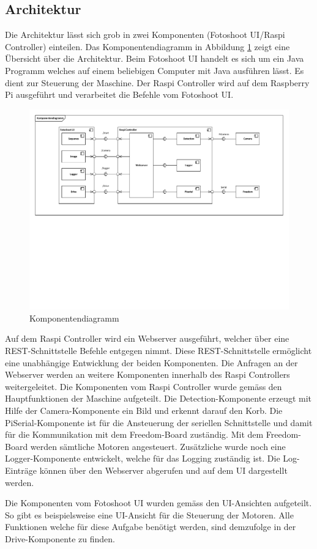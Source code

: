 \subsection{Architektur}

Die Architektur lässt sich grob in zwei Komponenten (Fotoshoot UI/Raspi Controller) einteilen. Das Komponentendiagramm in Abbildung \ref{fig:komponentendiagramm} zeigt eine Übersicht über die Architektur. Beim Fotoshoot UI handelt es sich um ein Java Programm welches auf einem beliebigen Computer mit Java ausführen lässt. Es dient zur Steuerung der Maschine. Der Raspi Controller wird auf dem Raspberry Pi ausgeführt und verarbeitet die Befehle vom Fotoshoot UI.

\begin{figure}
	\centering
	\includegraphics[width=\linewidth]{../../fig/komponentendiagramm}
	\caption{Komponentendiagramm}
	\label{fig:komponentendiagramm}
\end{figure}

Auf dem Raspi Controller wird ein Webserver ausgeführt, welcher über eine REST-Schnittstelle Befehle entgegen nimmt. Diese REST-Schnittstelle ermöglicht eine unabhängige Entwicklung der beiden Komponenten. Die Anfragen an der Webserver werden an weitere Komponenten innerhalb des Raspi Controllers weitergeleitet. Die Komponenten vom Raspi Controller wurde gemäss den Hauptfunktionen der Maschine aufgeteilt. Die Detection-Komponente erzeugt mit Hilfe der Camera-Komponente ein Bild und erkennt darauf den Korb. Die PiSerial-Komponente ist für die Ansteuerung der seriellen Schnittstelle und damit für die Kommunikation mit dem Freedom-Board zuständig. Mit dem Freedom-Board werden sämtliche Motoren angesteuert. Zusätzliche wurde noch eine Logger-Komponente entwickelt, welche für das Logging zuständig ist. Die Log-Einträge können über den Webserver abgerufen und auf dem UI dargestellt werden.

Die Komponenten vom Fotoshoot UI wurden gemäss den UI-Ansichten aufgeteilt. So gibt es beispielsweise eine UI-Ansicht für die Steuerung der Motoren. Alle Funktionen welche für diese Aufgabe benötigt werden, sind demzufolge in der Drive-Komponente zu finden.